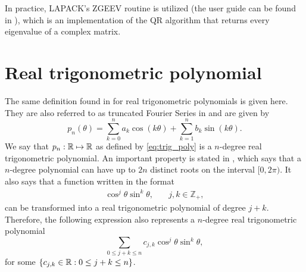  In practice, LAPACK's ZGEEV routine is utilized (the user guide can be found in ), which is an implementation of the QR algorithm that returns every eigenvalue of a complex matrix.
 
\section{Real trigonometric polynomial}

The same definition found in  for real trigonometric polynomials is given here. They are also referred to as truncated Fourier Series in  and are given by
\begin{equation}\label{eq:trig_poly}
p_n(\theta) = \sum_{k=0}^{n} a_k\cos(k\theta) + \sum_{k=1}^{n} b_k\sin(k\theta).
\end{equation}
We say that $p_n: \mathbb{R} \mapsto \mathbb{R}$ as defined by \autoref{eq:trig_poly} is a $n$-degree real trigonometric polynomial. An important property is stated in , which says that a $n$-degree polynomial can have up to $2n$ distinct roots on the interval $[0, 2\pi)$. It also says that a function written in the format
$$\begin{array}{cc}\cos^j{\theta}\sin^k{\theta}, & \quad j, k \in \mathbb{Z}_+, \end{array}$$
can be transformed into a real trigonometric polynomial of degree $j+k$. Therefore, the following expression also represents a $n$-degree real trigonometric polynomial
\begin{equation}\label{eq:trig_poly_2}
\sum_{0 \le j+k \le n}c_{j,k}\cos^j{\theta}\sin^k{\theta},
\end{equation}
for some $\{c_{j,k} \in \mathbb{R}: 0 \le j+k \le n\}$.